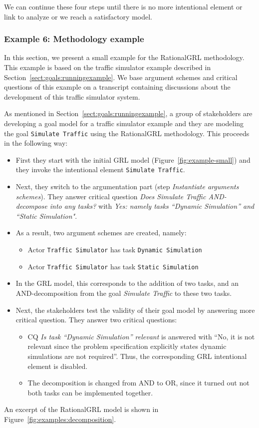 We can continue these four steps until there is no more intentional element or link to analyze or we reach a satisfactory model. 

\subsubsection{Example 6: Methodology example}

In this section, we present a small example for the RationalGRL methodology. This example is based on the traffic simulator example described in Section~\ref{sect:goals:runningexample}. We base argument schemes and critical questions of this example on a transcript containing discussions about the development of this traffic simulator system. %

As mentioned in Section~\ref{sect:goals:runningexample}, a group of stakeholders are developing a goal model for a traffic simulator example and they are modeling the goal \texttt{Simulate Traffic} using the RationalGRL methodology. This proceeds in the following way:
\begin{itemize}
\item
First they start %
with the initial GRL model (Figure~\ref{fig:example-small}) and they invoke the intentional element \texttt{Simulate Traffic}. 
\item Next, they switch to the argumentation part (step \emph{Instantiate arguments schemes}). They answer critical question \emph{Does Simulate Traffic AND-decompose into any tasks?} with \emph{Yes: namely tasks ``Dynamic Simulation'' and ``Static Simulation"}.
\item As a result, two argument schemes are created, namely:
\begin{itemize}
\item Actor \texttt{Traffic Simulator} has task \texttt{Dynamic Simulation}
\item Actor \texttt{Traffic Simulator} has task \texttt{Static Simulation}
\end{itemize}
\item In the GRL model, this corresponds to the addition of two tasks, and an AND-decomposition from the goal \emph{Simulate Traffic} to these two tasks.
\item Next, the stakeholders test the validity of their goal model by answering more critical question. They answer two critical questions:
\begin{itemize}
\item
CQ \emph{Is task ``Dynamic Simulation'' relevant} is answered with ``No, it is not relevant since the problem specification explicitly states dynamic simulations are not required''. Thus, the corresponding GRL intentional element is disabled.
\item The decomposition is changed from AND to OR, since it turned out not both tasks can be implemented together.
\end{itemize}
\end{itemize}

An excerpt of the RationalGRL model is shown in Figure~\ref{fig:examples:decomposition}. %
